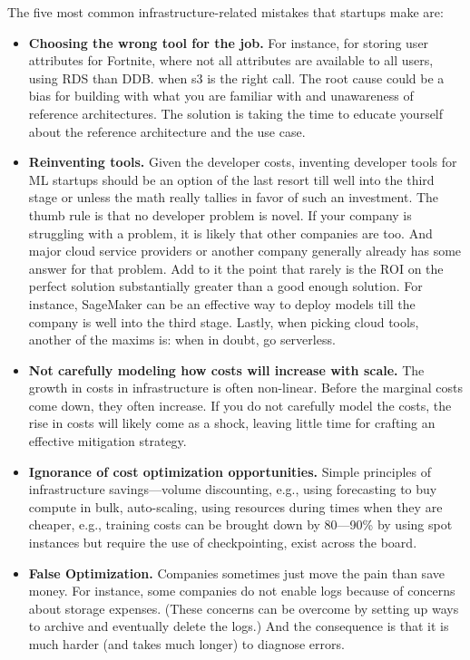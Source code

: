 \documentclass[12pt, letterpaper]{article}
\begin{document}
The five most common infrastructure-related mistakes that startups make are:
\begin{itemize}

    \item \textbf{Choosing the wrong tool for the job.} For instance, for storing user attributes for Fortnite, where not all attributes are available to all users, using RDS than DDB. when s3 is the right call. The root cause could be a bias for building with what you are familiar with and unawareness of reference architectures. The solution is taking the time to educate yourself about the reference architecture and the use case. 
    
    \item \textbf{Reinventing tools.} Given the developer costs, inventing developer tools for ML startups should be an option of the last resort till well into the third stage or unless the math really tallies in favor of such an investment. The thumb rule is that no developer problem is novel. If your company is struggling with a problem, it is likely that other companies are too. And major cloud service providers or another company generally already has some answer for that problem. Add to it the point that rarely is the ROI on the perfect solution substantially greater than a good enough solution. For instance, SageMaker can be an effective way to deploy models till the company is well into the third stage. Lastly, when picking cloud tools, another of the maxims is: when in doubt, go serverless.
    
    \item \textbf{Not carefully modeling how costs will increase with scale.} The growth in costs in infrastructure is often non-linear. Before the marginal costs come down, they often increase. If you do not carefully model the costs, the rise in costs will likely come as a shock, leaving little time for crafting an effective mitigation strategy.  
    
    \item \textbf{Ignorance of cost optimization opportunities.} Simple principles of infrastructure savings—volume discounting, e.g., using forecasting to buy compute in bulk, auto-scaling, using resources during times when they are cheaper, e.g., training costs can be brought down by 80—90\% by using spot instances but require the use of checkpointing, exist across the board. 
    
    \item \textbf{False Optimization.} Companies sometimes just move the pain than save money. For instance, some companies do not enable logs because of concerns about storage expenses. (These concerns can be overcome by setting up ways to archive and eventually delete the logs.) And the consequence is that it is much harder (and takes much longer) to diagnose errors.

\end{itemize}
\end{document}
